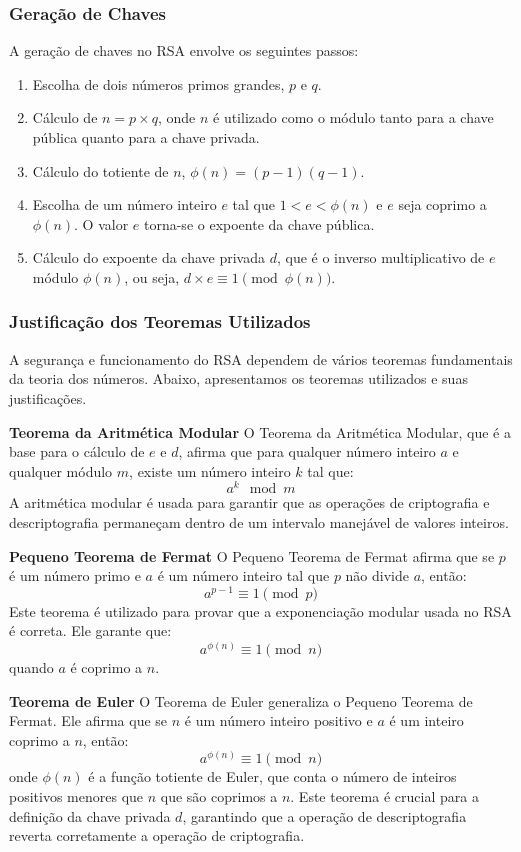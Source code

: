 \documentclass[a4paper,12pt]{article}
\begin{document}
\subsubsection*{Geração de Chaves}
A geração de chaves no RSA envolve os seguintes passos:
\begin{enumerate}
    \item Escolha de dois números primos grandes, \( p \) e \( q \).
    \item Cálculo de \( n = p \times q \), onde \( n \) é utilizado como o módulo tanto para a chave pública quanto para a chave privada.
    \item Cálculo do totiente de \( n \), \( \phi(n) = (p-1)(q-1) \).
    \item Escolha de um número inteiro \( e \) tal que \( 1 < e < \phi(n) \) e \( e \) seja coprimo a \( \phi(n) \). O valor \( e \) torna-se o expoente da chave pública.
    \item Cálculo do expoente da chave privada \( d \), que é o inverso multiplicativo de \( e \) módulo \( \phi(n) \), ou seja, \( d \times e \equiv 1 \pmod{\phi(n)} \).
\end{enumerate}

\subsubsection*{Justificação dos Teoremas Utilizados}
A segurança e funcionamento do RSA dependem de vários teoremas fundamentais da teoria dos números. Abaixo, apresentamos os teoremas utilizados e suas justificações.

\textbf{Teorema da Aritmética Modular}
O Teorema da Aritmética Modular, que é a base para o cálculo de \( e \) e \( d \), afirma que para qualquer número inteiro \( a \) e qualquer módulo \( m \), existe um número inteiro \( k \) tal que:
\[ a^k \mod m \]
A aritmética modular é usada para garantir que as operações de criptografia e descriptografia permaneçam dentro de um intervalo manejável de valores inteiros.

\textbf{Pequeno Teorema de Fermat}
O Pequeno Teorema de Fermat afirma que se \( p \) é um número primo e \( a \) é um número inteiro tal que \( p \) não divide \( a \), então:
\[ a^{p-1} \equiv 1 \pmod{p} \]
Este teorema é utilizado para provar que a exponenciação modular usada no RSA é correta. Ele garante que:
\[ a^{\phi(n)} \equiv 1 \pmod{n} \]
quando \( a \) é coprimo a \( n \).

\textbf{Teorema de Euler}
O Teorema de Euler generaliza o Pequeno Teorema de Fermat. Ele afirma que se \( n \) é um número inteiro positivo e \( a \) é um inteiro coprimo a \( n \), então:
\[ a^{\phi(n)} \equiv 1 \pmod{n} \]
onde \( \phi(n) \) é a função totiente de Euler, que conta o número de inteiros positivos menores que \( n \) que são coprimos a \( n \). Este teorema é crucial para a definição da chave privada \( d \), garantindo que a operação de descriptografia reverta corretamente a operação de criptografia.
\end{document}
